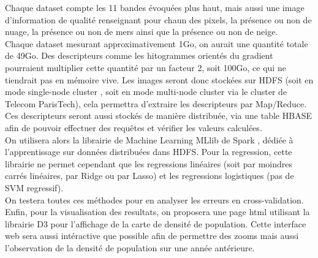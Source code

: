 \documentclass{book}
\begin{document}
Chaque dataset compte les 11 bandes évoquées plus haut, mais aussi une image d'information de 
qualité renseignant pour chaun des pixels, la présence ou non de nuage, la présence ou non de mers ainsi que la 
présence ou non de neige.\\
Chaque dataset mesurant approximativement 1Go, on aurait une quantité totale de 49Go. Des descripteurs comme les 
hitogrammes orientés du gradient pourraient multiplier cette quantité par un facteur 2, soit 100Go, ce qui ne tiendrait pas 
en mémoire vive.
Les images seront donc stockées sur HDFS \cite{White:2009:HDG:1717298} (soit en mode \og single-node cluster \fg, soit en mode \og multi-node cluster \fg via le cluster de Telecom ParisTech), cela permettra
d'extraire les descripteurs par Map/Reduce. Ces descripteurs seront aussi stockés de manière distribuée, via une table HBASE afin de 
pouvoir effectuer des requ\^{e}tes et vérifier les valeurs calculées.\\
On utilisera alors la librairie de Machine Learning MLlib de Spark \cite{Meng:2016:MML:2946645.2946679}, dédiée à l'apprentissage sur données distribuées dans HDFS.
Pour la regression, cette librairie ne permet cependant que les regressions linéaires (soit par moindres carrés linéaires, par Ridge ou par Lasso) et les regressions logistiques (pas de SVM regressif).\\
On testera toutes ces méthodes pour en analyser les erreurs en cross-validation.\\
Enfin, pour la visualisation des resultats, on proposera une page html utilisant la librairie D3 \cite{Jain:2014:DVD:2667432.2667451} pour l'affichage de la carte de densité de population. Cette interface web sera aussi
intéractive que possible afin de permettre des zooms mais aussi l'observation de la densité de population sur une année antérieure.

\clearpage

\backmatter





\end{document}
